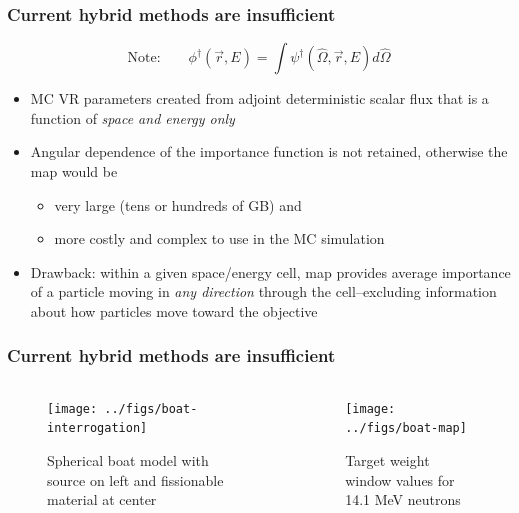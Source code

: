 \documentclass[xcolor=x11names,compress]{beamer}
\renewcommand{\(}{\begin{columns}}
\renewcommand{\)}{\end{columns}}
\newcommand{\<}[1]{\begin{column}{#1}}
\renewcommand{\>}{\end{column}}
\newcommand{\vOmega}{\ensuremath{\hat{\Omega}}}
\newcommand{\ve}[1]{\ensuremath{\vec{#1}}}
\begin{document}
\begin{frame}[fragile]
  \frametitle{Current hybrid methods are insufficient}

\[\text{Note:}\qquad\phi^{\dagger}(\ve{r},E) = \int \psi^{\dagger}(\vOmega, 
		\ve{r},E) d\vOmega\]

	\begin{itemize}
	\item MC VR parameters created from adjoint deterministic scalar flux that is a function of \textit{space and energy only} \vspace*{1 em}
	\pause
	\item Angular dependence of the importance function is not retained, otherwise the map would be 
	\begin{itemize}
	  \item very large (tens or hundreds of GB) and
	  \item more costly and complex to use in the MC simulation 
	\end{itemize}
	\pause
	\item Drawback: within a given space/energy cell, map provides average importance of a particle moving in \textit{any direction} through the cell--excluding information about how particles move \alert{toward the objective}
	\end{itemize}

\end{frame}

\begin{frame}[fragile]
  \frametitle{Current hybrid methods are insufficient}

	\begin{columns}
  	\begin{column}{0.5\textwidth}
 	 \begin{center}
 	 \begin{figure}
 	 \texttt{[image: ../figs/boat-interrogation]}  
 	 \caption{Spherical boat model with source on left and fissionable material at center}
 	 \end{figure}
 	 \end{center}
  	\end{column}
 	\begin{column}{0.5\textwidth}
 	 \begin{center}
 	 \begin{figure}
 	 \texttt{[image: ../figs/boat-map]}  
 	 \caption{Target weight window values for 14.1 MeV neutrons}
 	 \end{figure}
 	 \end{center}
  	\end{column}
	\end{columns}

\end{frame}
\end{document}
